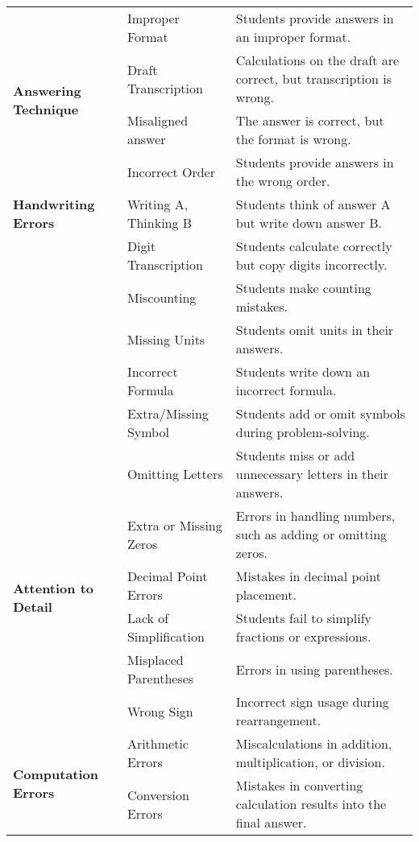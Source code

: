 \begin{table}[htbp]
{\begin{tabular}{|p{3cm}|p{3cm}|p{8cm}|}
\hline
\multirow{4}{4cm}{\textbf{Answering Technique}} & Improper Format & Students provide answers in an improper format. \\ \cline{2-3}
 & Draft Transcription & Calculations on the draft are correct, but transcription is wrong. \\ \cline{2-3}
 & Misaligned answer & The answer is correct, but the format is wrong. \\ \cline{2-3}
 & Incorrect Order & Students provide answers in the wrong order. \\ \hline
\multirow{1}{4cm}{\textbf{Handwriting Errors}} & Writing A, Thinking B & Students think of answer A but write down answer B. \\ \cline{2-3}
& {Digit Transcription} & Students calculate correctly but copy digits incorrectly. \\
\cline{2-3}
& {Miscounting} & Students make counting mistakes. \\
\cline{2-3}
& {Missing Units} & Students omit units in their answers. \\
\cline{2-3}
& {Incorrect Formula} & Students write down an incorrect formula. \\
\cline{2-3}
& {Extra/Missing Symbol} & Students add or omit symbols during problem-solving. \\
\cline{2-3}
& {Omitting Letters} & Students miss or add unnecessary letters in their answers. \\
\hline
\multirow{4}{4cm}{{\textbf{Attention to Detail}}} & Extra or Missing Zeros & Errors in handling numbers, such as adding or omitting zeros. \\  \cline{2-3}
& {Decimal Point Errors} & Mistakes in decimal point placement. \\  \cline{2-3}
& {Lack of Simplification} & Students fail to simplify fractions or expressions. \\  \cline{2-3}
& {Misplaced Parentheses} & Errors in using parentheses. \\  \cline{2-3}
& {Wrong Sign} & Incorrect sign usage during rearrangement. \\
\hline

\multirow{6}{4cm}{\textbf{Computation Errors}} & Arithmetic Errors & Miscalculations in addition, multiplication, or division. \\   \cline{2-3}
& {Conversion Errors} & Mistakes in converting calculation results into the final answer. \\   \cline{2-3}


\end{tabular}}
\end{table}
